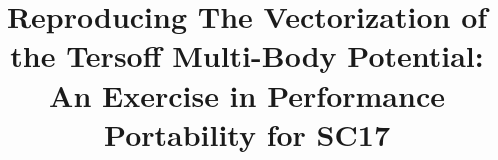 \documentclass{sig-alternate-05-2015}
\begin{document}


%

\title{Reproducing The Vectorization of the Tersoff Multi-Body Potential:  An Exercise in Performance Portability for SC17}
%
%
%
%
%
\end{document}

